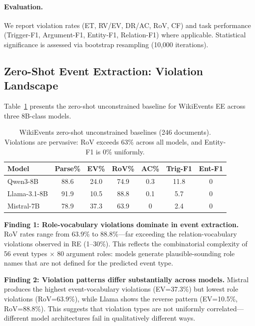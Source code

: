 \documentclass[11pt]{article}
\begin{document}
\paragraph{Evaluation.}
We report violation rates (ET, RV/EV, DR/AC, RoV, CF) and task performance (Trigger-F1, Argument-F1, Entity-F1, Relation-F1) where applicable.
Statistical significance is assessed via bootstrap resampling (10,000 iterations).


\subsection{Zero-Shot Event Extraction: Violation Landscape}
\label{sec:ee_landscape}

Table~\ref{tab:ee_unconstrained} presents the zero-shot unconstrained baseline for WikiEvents EE across three 8B-class models.

\begin{table}[t]
\centering
\small
\caption{WikiEvents zero-shot unconstrained baselines (246 documents). Violations are pervasive: RoV exceeds 63\% across all models, and Entity-F1 is 0\% uniformly.}
\label{tab:ee_unconstrained}
\begin{tabular}{lcccccc}
\toprule
\textbf{Model} & \textbf{Parse\%} & \textbf{EV\%} & \textbf{RoV\%} & \textbf{AC\%} & \textbf{Trig-F1} & \textbf{Ent-F1} \\
\midrule
Qwen3-8B     & 88.6 & 24.0 & 74.9 & 0.3 & 11.8 & 0 \\
Llama-3.1-8B & 91.9 & 10.5 & 88.8 & 0.1 & 5.7  & 0 \\
Mistral-7B   & 78.9 & 37.3 & 63.9 & 0   & 2.4  & 0 \\
\bottomrule
\end{tabular}
\end{table}

\textbf{Finding 1: Role-vocabulary violations dominate in event extraction.}
RoV rates range from 63.9\% to 88.8\%---far exceeding the relation-vocabulary violations observed in RE (1--30\%).
This reflects the combinatorial complexity of 56 event types $\times$ 80 argument roles: models generate plausible-sounding role names that are not defined for the predicted event type.

\textbf{Finding 2: Violation patterns differ substantially across models.}
Mistral produces the highest event-vocabulary violations (EV=37.3\%) but lowest role violations (RoV=63.9\%), while Llama shows the reverse pattern (EV=10.5\%, RoV=88.8\%).
This suggests that violation types are not uniformly correlated---different model architectures fail in qualitatively different ways.
\end{document}
